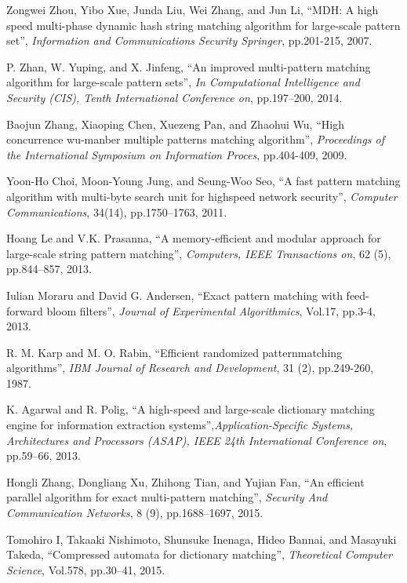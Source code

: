 \documentclass{article}
\begin{document}
\begin{thebibliography}{99}
 Zongwei Zhou, Yibo Xue, Junda Liu, Wei Zhang, and
  Jun Li, ``MDH: A high speed multi-phase dynamic hash string matching
  algorithm for large-scale pattern set'', {\it Information and
    Communications Security Springer}, pp.201-215, 2007.


 P. Zhan, W. Yuping, and X. Jinfeng, ``An improved
  multi-pattern matching algorithm for large-scale pattern sets'',
  {\it In Computational Intelligence and Security (CIS), Tenth
    International Conference on}, pp.197–200, 2014.

 Baojun Zhang, Xiaoping Chen, Xuezeng Pan, and
  Zhaohui Wu, ``High concurrence wu-manber multiple patterns matching
  algorithm'', {\it Proceedings of the International Symposium on
    Information Proces}, pp.404-409, 2009.

 Yoon-Ho Choi, Moon-Young Jung, and Seung-Woo Seo,
  ``A fast pattern matching algorithm with multi-byte search unit for
  highspeed network security'', {\it Computer Communications}, 34(14),
  pp.1750–1763, 2011.

 Hoang Le and V.K. Prasanna, ``A memory-efficient and
  modular approach for large-scale string pattern matching'', {\it
    Computers, IEEE Transactions on}, 62 (5), pp.844–857, 2013.

 Iulian Moraru and David G. Andersen, ``Exact
  pattern matching with feed-forward bloom filters'', {\it Journal of
    Experimental Algorithmics}, Vol.17, pp.3-4, 2013.

 R. M. Karp and M. O. Rabin, ``Efficient randomized
  patternmatching algorithms'', {\it IBM Journal of Research and
    Development}, 31 (2), pp.249-260, 1987.

 K. Agarwal and R. Polig, ``A high-speed and
  large-scale dictionary matching engine for information extraction
  systems'',{\it Application-Specific Systems, Architectures and
    Processors (ASAP), IEEE 24th International Conference on},
  pp.59–66, 2013.

 Hongli Zhang, Dongliang Xu, Zhihong Tian, and
  Yujian Fan, ``An efficient parallel algorithm for exact
  multi-pattern matching'', {\it Security And Communication Networks},
  8 (9), pp.1688–1697, 2015.

 Tomohiro I, Takaaki Nishimoto, Shunsuke Inenaga, Hideo
  Bannai, and Masayuki Takeda, ``Compressed automata for dictionary
  matching'', {\it Theoretical Computer Science}, Vol.578, pp.30–41,
  2015.


\end{thebibliography}
\end{document}
